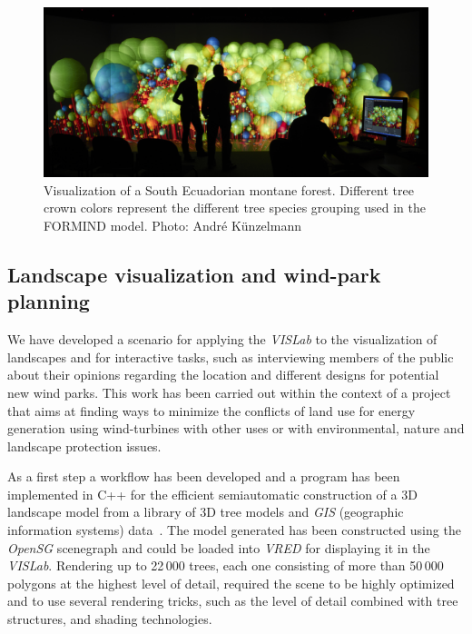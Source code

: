 \documentclass[twocolumn]{svjour3}          %
\begin{document}
\begin{figure}[htb]
  \includegraphics[width=\linewidth]{images/biodiversity.jpg}
\caption{Visualization of a South Ecuadorian montane forest. Different tree crown colors represent the different tree species grouping used in the FORMIND model. Photo: Andr\'{e} K\"unzelmann}
\label{fig:biodiversity}
\end{figure}


\subsection{Landscape visualization and wind-park planning}
\label{windpark-planning}

We have developed a scenario for applying the \emph{VISLab} to the visualization of landscapes and for interactive tasks, such as interviewing members of the public about their opinions regarding the location and different designs for potential new wind parks. This work has been carried out within the context of a project that aims at finding ways to minimize the conflicts of land use for energy generation using wind-turbines with other uses or with environmental, nature and landscape protection issues.

As a first step a workflow has been developed and a program has been implemented in C++ for the efficient semiautomatic construction of a 3D landscape model from a library of 3D tree models and \emph{GIS} (geographic information systems) data~\cite{zehner:landscape}. The model generated has been constructed using the \emph{OpenSG} scenegraph and could be loaded into \emph{VRED} for displaying it in the \emph{VISLab}. Rendering up to 22\,000 trees, each one consisting of more than 50\,000 polygons at the highest level of detail, required the scene to be highly optimized and to use several rendering tricks, such as the level of detail combined with tree structures, and shading technologies.
\end{document}
